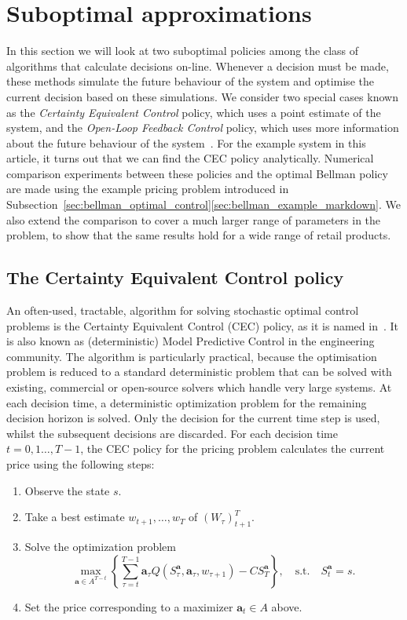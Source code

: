 \documentclass{rsproca_new}
\makeatletter
\theoremstyle{definition}
\renewcommand{\todo}[2][]{\tikzexternaldisable\@todo[#1]{#2}\tikzexternalenable}
\makeatother
\begin{document}
\section{Suboptimal
  approximations}\label{sec:suboptimal_approximations}
\todo[inline]{Update introduction here}
In this section we will look at two suboptimal policies among the class of
algorithms that calculate decisions on-line.
Whenever a decision must be made, these methods simulate the future
behaviour of the system and optimise the current decision based on
these simulations.
We consider two special cases known as the
\emph{Certainty Equivalent Control} policy, which uses a point
estimate of the system, and
the \emph{Open-Loop Feedback Control} policy, which uses more
information about the  future behaviour of the system~\cite[Ch.~6]{bertsekas2005dynamic}.
For the example system in this article, it turns out that we can find
the CEC policy analytically.
Numerical comparison experiments between these policies and the optimal
Bellman policy are
made using the example pricing problem introduced in
Subsection~\ref{sec:bellman_optimal_control}\ref{sec:bellman_example_markdown}. We also extend the comparison to
cover a much larger range of parameters in the problem, to show that
the same results hold for a wide range of retail products.

\subsection{The Certainty Equivalent Control policy}
An often-used, tractable, algorithm for solving stochastic optimal control
problems is the Certainty Equivalent Control (CEC) policy, as it is
named in~\cite{bertsekas2005dynamic}.
It is also known as (deterministic) Model
Predictive Control in the engineering community.
The algorithm is particularly practical, because the optimisation
problem is reduced to a standard deterministic problem that can
be solved with existing, commercial or open-source solvers which
handle very large systems.
At each decision time, a deterministic optimization problem for the
remaining decision horizon is solved. Only the decision for the
current time step is
used, whilst the subsequent decisions are discarded.
For each decision time $t=0,1\dots,T-1$, the CEC policy for the pricing
problem calculates the current price using the following steps:
\begin{enumerate}
\item Observe the state $s$.
\item Take a best estimate $w_{t+1},\dots,w_T$ of ${(W_\tau)}_{t+1}^T$.
\item Solve the optimization problem
  \begin{equation}\label{eq:cec_optim_problem}
    \max_{\mathbf a\in A^{T-t}}\left\{\sum_{\tau=t}^{T-1}\mathbf
      a_\tau Q(S_\tau^{\mathbf a},\mathbf
      a_\tau,w_{\tau+1})-CS_T^{\mathbf a}\right\},
    \quad \text{s.t.}\quad S_t^{\mathbf a}=s.
  \end{equation}
\item Set the price corresponding to a maximizer
  $\mathbf a_t\in A$ above.
\end{enumerate}
\end{document}
